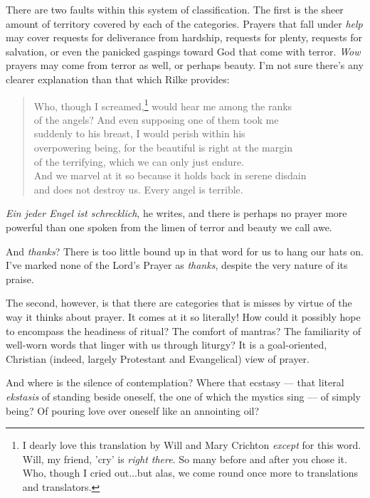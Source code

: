 There are two faults within this system of classification. The first is the sheer amount of territory covered by each of the categories. Prayers that fall under \emph{help} may cover requests for deliverance from hardship, requests for plenty, requests for salvation, or even the panicked gaspings toward God that come with terror. \emph{Wow} prayers may come from terror as well, or perhaps beauty. I'm not sure there's any clearer explanation than that which Rilke provides:

\begin{verse}
Who, though I screamed,\footnote{I dearly love this translation by Will and Mary Crichton \emph{except} for this word. Will, my friend, 'cry' is \emph{right there}. So many before and after you chose it. Who, though I cried out...but alas, we come round once more to translations and translators.} would hear me among the ranks \\
of the angels? And even supposing one of them took me \\
suddenly to his breast, I would perish within his \\
overpowering being, for the beautiful is right at the margin \\
of the terrifying, which we can only just endure. \\
And we marvel at it so because it holds back in serene disdain \\
and does not destroy us. Every angel is terrible.

\parencite[11]{duino}
\end{verse}

\emph{Ein jeder Engel ist schrecklich}, he writes, and there is perhaps no prayer more powerful than one spoken from the limen of terror and beauty we call awe.

And \emph{thanks}? There is too little bound up in that word for us to hang our hats on. I've marked none of the Lord's Prayer as \emph{thanks}, despite the very nature of its praise.

The second, however, is that there are categories that is misses by virtue of the way it thinks about prayer. It comes at it so literally! How could it possibly hope to encompass the headiness of ritual? The comfort of mantras? The familiarity of well-worn words that linger with us through liturgy? It is a goal-oriented, Christian (indeed, largely Protestant and Evangelical) view of prayer.

And where is the silence of contemplation? Where that ecstasy --- that literal \emph{ekstasis} of standing beside oneself, the one of which the mystics sing --- of simply being? Of pouring love over oneself like an annointing oil?

